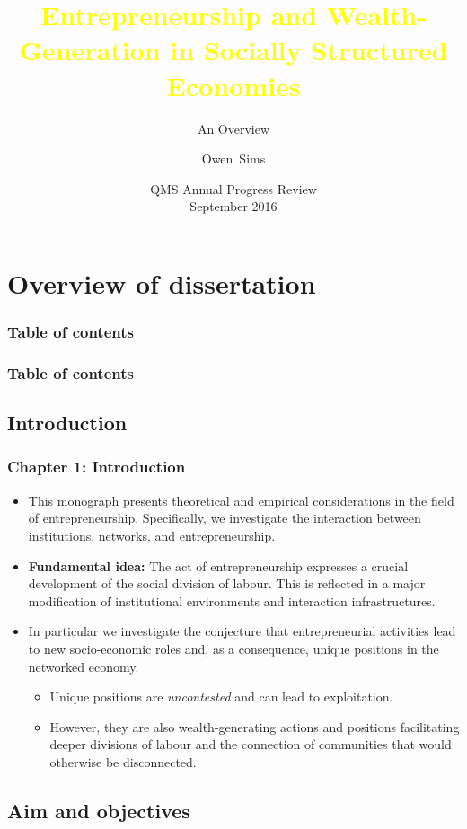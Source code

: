 \documentclass[10pt]{beamer}
\title[EntrepreneurshipSSE]{\textcolor{yellow}{Entrepreneurship and Wealth-Generation in Socially Structured Economies}}
\subtitle{An Overview}
\author[Sims]{Owen~Sims}
\institute[QUB]{Center for Data Science and Scalable Computing\\ Queen's University Belfast}
\date[APR 2016]{QMS Annual Progress Review\\ September 2016}
\begin{document}
\begin{frame}
\titlepage
\end{frame}

\section{Overview of dissertation}

\begin{frame}
\frametitle{Table of contents}
\tableofcontents
\end{frame}

\begin{frame}
\frametitle{Table of contents}
\tableofcontents[currentsection]
\end{frame}

\subsection{Introduction}

\begin{frame} \frametitle{Chapter 1: Introduction}
\begin{itemize}
\item This monograph presents theoretical and empirical considerations in the field of entrepreneurship. Specifically, we investigate the interaction between institutions, networks, and entrepreneurship.
\medskip
\item \textbf{Fundamental idea:} The act of entrepreneurship expresses a crucial development of the social division of labour. This is reflected in a major modification of institutional environments and interaction infrastructures.
\medskip
\item In particular we investigate the conjecture that entrepreneurial activities lead to new socio-economic roles and, as a consequence, unique positions in the networked economy.
\begin{itemize}
\medskip
\item Unique positions are \emph{uncontested} and can lead to exploitation.
\medskip
\item However, they are also wealth-generating actions and positions facilitating deeper divisions of labour and the connection of communities that would otherwise be disconnected.
\end{itemize}
\end{itemize}
\end{frame}

\subsection{Aim and objectives}
\end{document}
